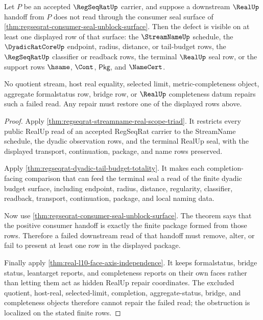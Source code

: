 \begin{theorem}
\label{thm:regseqrat-consumer-seal-defect-localization}
Let $P$ be an accepted $\RegSeqRatUp$ carrier, and suppose a downstream
$\RealUp$ handoff from $P$ does not read through the consumer seal surface of
\autoref{thm:regseqrat-consumer-seal-unblock-surface}. Then the defect is
visible on at least one displayed row of that surface: the $\StreamNameUp$
schedule, the $\DyadicRatCoreUp$ endpoint, radius, distance, or tail-budget
rows, the $\RegSeqRatUp$ classifier or readback rows, the terminal $\RealUp$
seal row, or the support rows $\hsame$, $\Cont$, $\mathsf{Pkg}$, and
$\NameCert$.

No quotient stream, host real equality, selected limit,
metric-completeness object, aggregate formalstatus row, bridge row, or
$\RealUp$ completeness datum repairs such a failed read. Any repair must
restore one of the displayed rows above.
\end{theorem}
\begin{proof}
Apply \autoref{thm:regseqrat-streamname-real-scope-triad}. It restricts every
public RealUp read of an accepted RegSeqRat carrier to the StreamName schedule,
the dyadic observation rows, and the terminal RealUp seal, with the displayed
transport, continuation, package, and name rows preserved.

Apply \autoref{thm:regseqrat-dyadic-tail-budget-totality}. It makes each
completion-facing comparison that can feed the terminal seal a read of the
finite dyadic budget surface, including endpoint, radius, distance,
regularity, classifier, readback, transport, continuation, package, and local
naming data.

Now use \autoref{thm:regseqrat-consumer-seal-unblock-surface}. The theorem
says that the positive consumer handoff is exactly the finite package formed
from those rows. Therefore a failed downstream read of that handoff must
remove, alter, or fail to present at least one row in the displayed package.

Finally apply \autoref{thm:real-l10-face-axis-independence}. It keeps
formalstatus, bridge status, leantarget reports, and completeness reports on
their own faces rather than letting them act as hidden RealUp repair
coordinates. The excluded quotient, host-real, selected-limit, completion,
aggregate-status, bridge, and completeness objects therefore cannot repair the
failed read; the obstruction is localized on the stated finite rows.
\end{proof}

